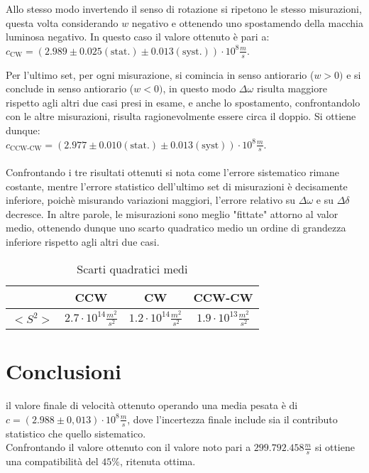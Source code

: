 \documentclass{article}
\begin{document}
Allo stesso modo invertendo il senso di rotazione si ripetono le stesso misurazioni, questa volta considerando \(w\) negativo e ottenendo uno spostamendo della macchia luminosa negativo. In questo caso il valore ottenuto è pari a: \\
\(c_\text{CW}=(2.989\pm 0.025 (\text{stat.}) \pm 0.013(\text{syst.}))\cdot 10^8 \frac{m}{s}\).


Per l'ultimo set, per ogni misurazione, si comincia in senso antiorario (\(w>0)\) e si conclude in senso antiorario (\(w<0)\), in questo modo \(\Delta\omega\) risulta maggiore rispetto agli altri due casi presi in esame, e anche lo spostamento, confrontandolo con le altre misurazioni, risulta ragionevolmente essere circa il doppio.
Si ottiene dunque:\\ 
\(c_\text{CCW-CW}=(2.977 \pm 0.010 (\text{stat.}) \pm 0.013 (\text{syst}))\cdot10^8\frac{m}{s}\).\\\\
Confrontando i tre risultati ottenuti si nota come l'errore sistematico rimane costante, mentre l'errore statistico dell'ultimo set di misurazioni è decisamente inferiore, poichè misurando variazioni maggiori, l'errore relativo su \(\Delta\omega\) e su \(\Delta\delta\) decresce. 
In altre parole, le misurazioni sono meglio "fittate" attorno al valor medio, ottenendo dunque uno scarto quadratico medio un ordine di grandezza inferiore rispetto agli altri due casi.

\begin{table}[h]
    \centering
    \begin{tabular}{|c|c|c|c|}
        \hline
       & \textbf{CCW} & \textbf{CW} & \textbf{CCW-CW} \\ \hline
        \(<S^2>\) & \(2.7\cdot 10^{14} \frac{m^2}{s^2}\) & \(1.2\cdot 10^{14}\frac{m^2}{s^2}\)    & \(1.9\cdot 10^{13}\frac{m^2}{s^2}\)                 \\ \hline
        
    \end{tabular}
    \caption{Scarti quadratici medi}
    \label{tab:intestazioni}
\end{table}
\section{Conclusioni}
il valore finale di velocità ottenuto operando una media pesata è di \\
\(c=(2.988\pm0,013)\cdot10^8\frac{m}{s}\), dove l'incertezza finale include sia il contributo statistico che quello sistematico. \\
Confrontando il valore ottenuto con il valore noto pari a \(299.792.458 \frac{m}{s}\) si ottiene una compatibilità del \(45\%\), ritenuta ottima.
\end{document}
